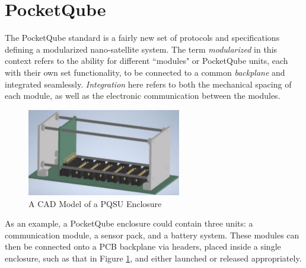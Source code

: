 \graphicspath{{./figures}}

\section{PocketQube}

The PocketQube standard is a fairly new set of protocols and specifications defining a modularized nano-satellite system. The term \textit{modularized} in this context refers to the ability for different ``modules" or PocketQube units, each with their own set functionality, to be connected to a common \textit{backplane} and integrated seamlessly. \textit{Integration} here refers to both the mechanical spacing of each module, as well as the electronic communication between the modules.

\begin{figure}[!htb]
    \centering
    \includegraphics[width=0.6\textwidth]{pq_enclosure}
    \caption{A CAD Model of a PQSU Enclosure \cite{standard-pqsu}}
    \label{fig:pq_enclosure}
\end{figure}

As an example, a PocketQube enclosure could contain three units: a communication module, a sensor pack, and a battery system. These modules can then be connected onto a PCB backplane via headers, placed inside a single enclosure, such as that in Figure \ref{fig:pq_enclosure}, and either launched or released appropriately.